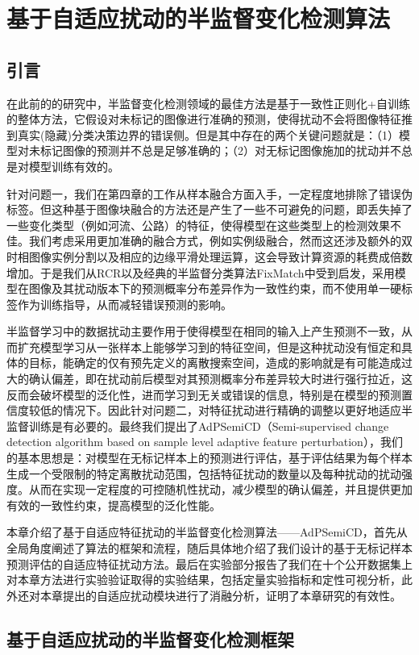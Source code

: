 \documentclass[lang=chs, degree=master, blindreview=false, adobe=false]{yanputhesis}
\begin{document}
\chapter{基于自适应扰动的半监督变化检测算法}
\section{引言}
在此前的的研究中，半监督变化检测领域的最佳方法是基于一致性正则化+自训练的整体方法，它假设对未标记的图像进行准确的预测，使得扰动不会将图像特征推到真实(隐藏)分类决策边界的错误侧。但是其中存在的两个关键问题就是：（1）模型对未标记图像的预测并不总是足够准确的；（2）对无标记图像施加的扰动并不总是对模型训练有效的。

针对问题一，我们在第四章的工作从样本融合方面入手，一定程度地排除了错误伪标签。但这种基于图像块融合的方法还是产生了一些不可避免的问题，即丢失掉了一些变化类型（例如河流、公路）的特征，使得模型在这些类型上的检测效果不佳。我们考虑采用更加准确的融合方式，例如实例级融合，然而这还涉及额外的双时相图像实例分割以及相应的边缘平滑处理运算，这会导致计算资源的耗费成倍数增加。于是我们从RCR\cite{bandara2022RCR}以及经典的半监督分类算法FixMatch\cite{sohn2020fixmatch}中受到启发，采用模型在图像及其扰动版本下的预测概率分布差异作为一致性约束，而不使用单一硬标签作为训练指导，从而减轻错误预测的影响。

半监督学习中的数据扰动主要作用于使得模型在相同的输入上产生预测不一致，从而扩充模型学习从一张样本上能够学习到的特征空间，但是这种扰动没有恒定和具体的目标，能确定的仅有预先定义的离散搜索空间，造成的影响就是有可能造成过大的确认偏差，即在扰动前后模型对其预测概率分布差异较大时进行强行拉近，这反而会破坏模型的泛化性，进而学习到无关或错误的信息，特别是在模型的预测置信度较低的情况下。因此针对问题二，对特征扰动进行精确的调整以更好地适应半监督训练是有必要的。最终我们提出了AdPSemiCD（Semi-supervised change detection algorithm based on sample level adaptive feature perturbation），我们的基本思想是：对模型在无标记样本上的预测进行评估，基于评估结果为每个样本生成一个受限制的特定离散扰动范围，包括特征扰动的数量以及每种扰动的扰动强度。从而在实现一定程度的可控随机性扰动，减少模型的确认偏差，并且提供更加有效的一致性约束，提高模型的泛化性能。

本章介绍了基于自适应特征扰动的半监督变化检测算法——AdPSemiCD，首先从全局角度阐述了算法的框架和流程，随后具体地介绍了我们设计的基于无标记样本预测评估的自适应特征扰动方法。最后在实验部分报告了我们在十个公开数据集上对本章方法进行实验验证取得的实验结果，包括定量实验指标和定性可视分析，此外还对本章提出的自适应扰动模块进行了消融分析，证明了本章研究的有效性。
\section{基于自适应扰动的半监督变化检测框架}
\end{document}
